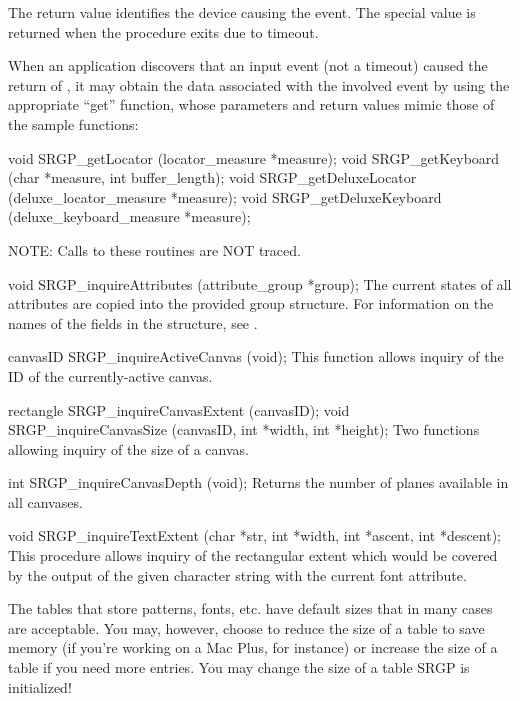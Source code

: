 \indentpar
The return value identifies the device causing the event.  The special value
is returned when the procedure exits due to timeout.

\newpar
When an application discovers that an input event (not a timeout) caused the
return of , it may obtain the data associated with the
involved event by using the appropriate ``get'' function, whose parameters and
return values mimic those of the sample functions:

\newsynopsis
void SRGP_getLocator (locator_measure *measure);
void SRGP_getKeyboard (char *measure, int buffer_length);
void SRGP_getDeluxeLocator (deluxe_locator_measure *measure);
void SRGP_getDeluxeKeyboard (deluxe_keyboard_measure *measure);
\endsynopsis



NOTE:  Calls to these routines are NOT traced.

\newsynopsis
void SRGP_inquireAttributes (attribute_group *group);
\endsynopsis
The current states of all
attributes are copied into the provided group structure.  For information on
the names of the fields in the structure, see .

\nextsynopsis
canvasID SRGP_inquireActiveCanvas (void);
\endsynopsis
This function allows inquiry of the ID of the currently-active canvas.

\nextsynopsis
rectangle SRGP_inquireCanvasExtent (canvasID);
void SRGP_inquireCanvasSize (canvasID, int *width, int *height);
\endsynopsis
Two functions allowing inquiry of the size of a canvas.


\nextsynopsis
int SRGP_inquireCanvasDepth (void);
\endsynopsis
Returns the number of planes available in all canvases.


\nextsynopsis
void SRGP_inquireTextExtent (char *str, int *width, int *ascent, int *descent);
\endsynopsis
This procedure allows inquiry of the rectangular extent which would be covered
by the output of the given character string with the current font attribute.



The tables that store patterns, fonts, etc. have default sizes that in many
cases are acceptable.  You may, however, choose to reduce the size of a table
to save memory (if you're working on a Mac Plus, for instance) or increase the
size of a table if you need more entries.  You may change the size of a table
 SRGP is initialized!

